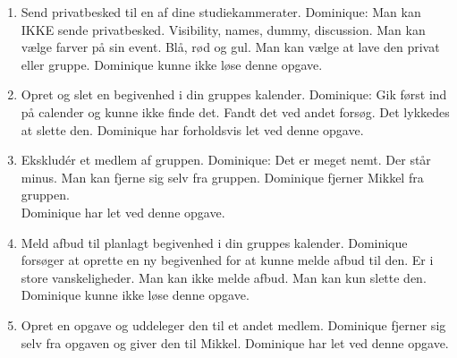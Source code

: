 \documentclass[12pt]{article}
\begin{document}
\begin{enumerate}
\item Send privatbesked til en af dine studiekammerater.
Dominique: Man kan IKKE sende privatbesked. Visibility, names, dummy, discussion. Man kan vælge farver på sin event. Blå, rød og gul. Man kan vælge at lave den privat eller gruppe.
Dominique kunne ikke løse denne opgave.\\

\item Opret og slet en begivenhed i din gruppes kalender.
Dominique: Gik først ind på calender og kunne ikke finde det. Fandt det ved andet forsøg. Det lykkedes at slette den.
Dominique har forholdsvis let ved denne opgave.\\

\item Ekskludér et medlem af gruppen.
Dominique: Det er meget nemt. Der står minus. Man kan fjerne sig selv fra gruppen. Dominique fjerner Mikkel fra gruppen.\\
Dominique har let ved denne opgave.

\item Meld afbud til planlagt begivenhed i din gruppes kalender.
Dominique forsøger at oprette en ny begivenhed for at kunne melde afbud til den. Er i store vanskeligheder. Man kan ikke melde afbud. Man kan kun slette den.\\
Dominique kunne ikke løse denne opgave.\\

\item Opret en opgave og uddeleger den til et andet medlem.
Dominique fjerner sig selv fra opgaven og giver den til Mikkel.
Dominique har let ved denne opgave.\\

\end{enumerate}
\end{document}
